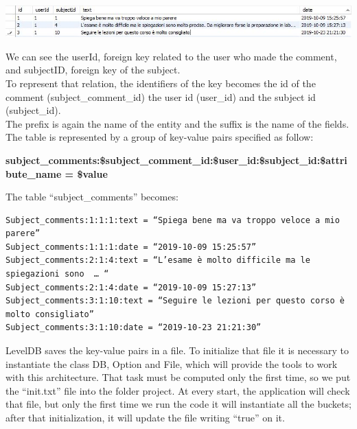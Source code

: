 \documentclass[a4paper, oneside]{article}
\begin{document}
\begin{minipage}{\linewidth}
\begin{center}
\vspace{4mm}
\includegraphics[width = 1\textwidth]{./images/table/subject_comments} 
\vspace{2mm}
\label{fig:subjectCommTable}
\end{center}
\vspace{3mm}
\end{minipage}
We can see the userId, foreign key related to the user who made the comment, and subjectID, foreign key of the subject.\\
To represent that relation, the identifiers of the key becomes the id of the comment (subject\_comment\_id) the user id (user\_id) and the subject id (subject\_id).\\ The prefix is again the name of the entity and the suffix is the name of the fields. The table is represented by a group of key-value pairs specified as follow:
\begin{center}
\textbf{subject\_comments:\$subject\_comment\_id:\$user\_id:\$subject\_id:\$attribute\_name = \$value}
\end{center}
\vspace{5mm}
The table “subject\_comments” becomes:
\begin{verbatim}
Subject_comments:1:1:1:text = “Spiega bene ma va troppo veloce a mio parere”
Subject_comments:1:1:1:date = “2019-10-09 15:25:57”
Subject_comments:2:1:4:text = “L’esame è molto difficile ma le spiegazioni sono  … “
Subject_comments:2:1:4:date = “2019-10-09 15:27:13”
Subject_comments:3:1:10:text = “Seguire le lezioni per questo corso è molto consigliato”
Subject_comments:3:1:10:date = “2019-10-23 21:21:30”
\end{verbatim}
LevelDB saves the key-value pairs in a file. To initialize that file it is necessary to instantiate the class DB, Option and File, which will provide the tools to work with this architecture. That task must be computed only the first time, so we put the “init.txt” file into the folder project. At every start, the application will check that file, but only the first time we run the code it will instantiate all the buckets; after that initialization, it will update the file writing “true” on it.\\
\end{document}
